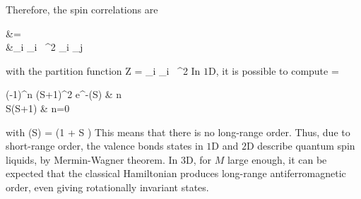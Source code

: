 		Therefore, the spin correlations are
		\be \begin{split}  &=  \\ &\cdot \int\prod_i \dd\hat \Omega_i \ ^2 \hat \Omega_i \cdot \hat \Omega_j  \end{split} \ee
		with the partition function
		\be Z = \int\prod_i \dd\hat \Omega_i \ ^2 \ee
		In $1$D, it is possible to compute
		\be {} = \begin{cases} (-1)^n (S+1)^2 e^{-\xi(S)} & n  \\ S(S+1) & n=0 \end{cases} \ee
		with 
		\be \xi(S) = \ln\left(1 +  S \right) \ee
		This means that there is no long-range order. Thus, due to short-range order, the valence bonds states in $1$D and $2$D describe quantum spin liquids, by Mermin-Wagner theorem. In $3$D, for $M$ large enough, it can be expected that the classical Hamiltonian produces long-range antiferromagnetic order, even giving rotationally invariant states.





